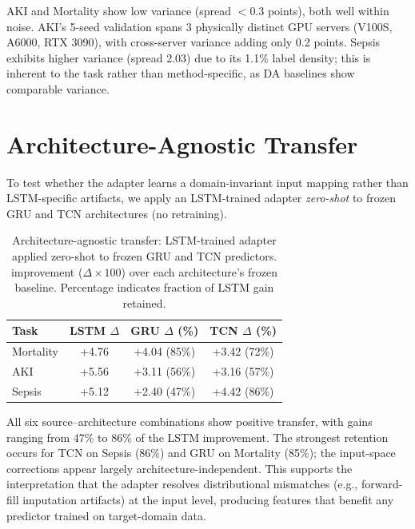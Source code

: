 AKI and Mortality show low variance (spread $<$0.3 \aucroc{} points), both well within noise.
AKI's 5-seed validation spans 3 physically distinct GPU servers (V100S, A6000, RTX 3090), with cross-server variance adding only 0.2 points.
Sepsis exhibits higher variance (spread 2.03) due to its 1.1\% label density; this is inherent to the task rather than method-specific, as DA baselines show comparable variance.


\section{Architecture-Agnostic Transfer}
\label{app:mas}

To test whether the adapter learns a domain-invariant input mapping rather than LSTM-specific artifacts, we apply an LSTM-trained adapter \emph{zero-shot} to frozen GRU and TCN architectures (no retraining).

\begin{table}[h]
\centering
\caption{Architecture-agnostic transfer: LSTM-trained adapter applied zero-shot to frozen GRU and TCN predictors. \aucroc{} improvement ($\Delta \times 100$) over each architecture's frozen baseline. Percentage indicates fraction of LSTM gain retained.}
\label{tab:mas}
\footnotesize
\setlength{\tabcolsep}{4pt}
\begin{tabular}{@{}lccc@{}}
\toprule
\textbf{Task} & \textbf{LSTM $\Delta$} & \textbf{GRU $\Delta$ (\%)} & \textbf{TCN $\Delta$ (\%)} \\
\midrule
Mortality & +4.76 & +4.04 (85\%) & +3.42 (72\%) \\
AKI       & +5.56 & +3.11 (56\%) & +3.16 (57\%) \\
Sepsis    & +5.12 & +2.40 (47\%) & +4.42 (86\%) \\
\bottomrule
\end{tabular}
\end{table}

All six source--architecture combinations show positive transfer, with gains ranging from 47\% to 86\% of the LSTM improvement.
The strongest retention occurs for TCN on Sepsis (86\%) and GRU on Mortality (85\%); the input-space corrections appear largely architecture-independent.
This supports the interpretation that the adapter resolves distributional mismatches (e.g., forward-fill imputation artifacts) at the input level, producing features that benefit any predictor trained on target-domain data.


